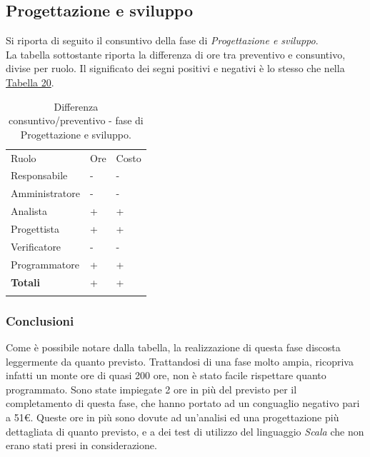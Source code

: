 \documentclass[a4paper]{article}
\begin{document}
			\subsection{Progettazione e sviluppo}
                Si riporta di seguito il consuntivo della fase di \emph{Progettazione e sviluppo}. \\
                La tabella sottostante riporta la differenza di ore tra preventivo e consuntivo, divise per ruolo. Il significato dei segni
                positivi e negativi è lo stesso che nella \hyperref[DCSceltaCapitolato]{Tabella 20}.
                \begin{table}[H]
				\begin{tabularx}{\textwidth}{Y Y Y}
					Ruolo & Ore & Costo \\
					Responsabile & - & - \\
					Amministratore & - & - \\
					Analista & + & + \\
					Progettista & + & + \\
					Verificatore & - & - \\
					Programmatore & + & + \\
					\textbf{Totali} & + & + \\
				\end{tabularx}
				\caption{Differenza consuntivo/preventivo - fase di Progettazione e sviluppo. } 
				\label{ConsuntivoSviluppo}
			\end{table}
				\subsubsection{Conclusioni}
                    Come è possibile notare dalla tabella, la realizzazione di questa fase discosta leggermente da quanto previsto. Trattandosi di una fase 
                    molto ampia, ricopriva infatti un monte ore di quasi 200 ore, non è stato facile rispettare quanto programmato. Sono state impiegate 
                    2 ore in più del previsto per il completamento di questa fase, che hanno portato ad un conguaglio negativo pari a 51\euro.
                    Queste ore in più sono dovute ad un'analisi ed una progettazione più dettagliata di quanto previsto, e a dei test di utilizzo del 
                    linguaggio \emph{Scala} che non erano stati presi in considerazione. 
                    
\end{document}
